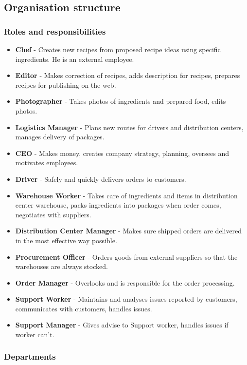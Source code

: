 \documentclass[11pt,a4paper]{article}
\begin{document}

\newpage
\subsection{Organisation structure}
\subsubsection{Roles and responsibilities}

\begin{itemize}
    \item \textbf{Chef} - Creates new recipes from proposed recipe ideas using specific ingredients. He is an external employee.
    \item \textbf{Editor} - Makes correction of recipes, adds description for recipes, prepares recipes for publishing on the web.
    \item \textbf{Photographer} - Takes photos of ingredients and prepared food, edits photos.
    \item \textbf{Logistics Manager} - Plans new routes for drivers and distribution centers, manages delivery of packages.
    \item \textbf{CEO} - Makes money, creates company strategy, planning, oversees and motivates employees.
    \item \textbf{Driver} - Safely and quickly delivers orders to customers.
    \item \textbf{Warehouse Worker} - Takes care of ingredients and items in distribution center warehouse, packs ingredients into packages when order comes, negotiates with suppliers.
    \item \textbf{Distribution Center Manager} - Makes sure shipped orders are delivered in the most effective way possible.
    \item \textbf{Procurement Officer} - Orders goods from external suppliers so that the warehouses are always stocked.
    \item \textbf{Order Manager} - Overlooks and is responsible for the order processing.
    \item \textbf{Support Worker} - Maintains and analyses issues reported by customers, communicates with customers, handles issues.
    \item \textbf{Support Manager} - Gives advise to Support worker, handles issues if worker can't.
\end{itemize}

\subsubsection{Departments}
\end{document}
